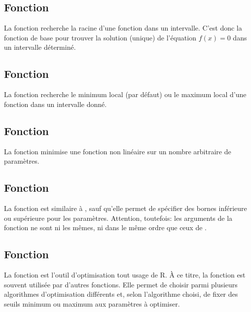 \subsection{Fonction }
\label{optimisation:fonctions:uniroot}

La fonction  recherche la racine d'une fonction dans un intervalle.
C'est donc la fonction de base pour trouver la solution (unique) de
l'équation $f(x) = 0$ dans un intervalle déterminé.


\subsection{Fonction }
\label{optimisation:fonctions:optimize}

La fonction  recherche le
minimum local (par
défaut) ou le maximum local d'une fonction dans un intervalle donné.


\subsection{Fonction }
\label{optimisation:fonctions:nlm}

La fonction  minimise une fonction non
linéaire
sur un nombre arbitraire de paramètres.


\subsection{Fonction }
\label{optimisation:fonctions:nlminb}

La fonction  est similaire à , sauf
qu'elle permet de spécifier des bornes inférieure ou supérieure
pour les paramètres. Attention, toutefois: les arguments de la
fonction ne sont ni les mêmes, ni dans le même ordre que ceux de
.


\subsection{Fonction }
\label{optimisation:fonctions:optim}

La fonction  est l'outil
d'optimisation tout usage de R. À ce titre, la fonction est souvent
utilisée par d'autres fonctions. Elle permet de choisir parmi
plusieurs algorithmes d'optimisation différents et, selon l'algorithme
choisi, de fixer des seuils minimum ou maximum aux paramètres à
optimiser.


